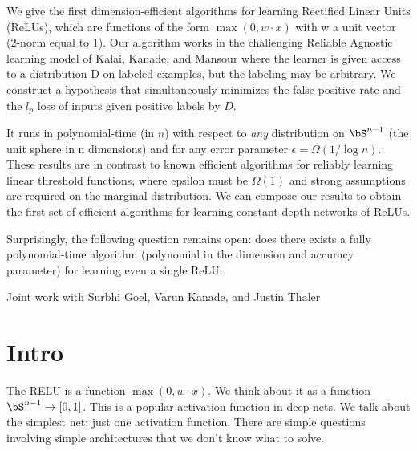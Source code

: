 \def\filepath{C:/Users/oldhe/Dropbox/Math/templates}






\pagestyle{fancy}
\chead{} 
\rhead{} 
\lfoot{} 
\cfoot{\thepage} 
\rfoot{} 
\renewcommand{\headrulewidth}{.3pt} 
\setlength\voffset{0in}
\setlength\textheight{648pt}






We give the first dimension-efficient algorithms for learning
Rectified Linear Units (ReLUs), which are functions of the form $\max(0,
w\cdot x)$ with w a unit vector (2-norm equal to 1). Our algorithm works in
the challenging Reliable Agnostic learning model of Kalai, Kanade, and
Mansour where the learner is given access to a distribution D on
labeled examples, but the labeling may be arbitrary. We construct a
hypothesis that simultaneously minimizes the false-positive rate and
the $l_p$ loss of inputs given positive labels by $D$.

It runs in polynomial-time (in $n$) with respect to {\em any}
distribution on $\bS^{n-1}$ (the unit sphere in n dimensions) and for any
error parameter $\epsilon = \Omega(1/ \log n)$. These results are in
contrast to known efficient algorithms for reliably learning linear
threshold functions, where epsilon must be $\Omega(1)$ and strong
assumptions are required on the marginal distribution. We can compose
our results to obtain the first set of efficient algorithms for
learning constant-depth networks of ReLUs.

Surprisingly, the following question remains open: does there exists a
fully polynomial-time algorithm (polynomial in the dimension and
accuracy parameter) for learning even a single ReLU.

Joint work with Surbhi Goel, Varun Kanade, and Justin Thaler

\section{Intro}

The RELU is a function $\max(0,w\cdot x)$. We think about it as a function $\bS^{n-1}\to [0,1]$. This is a popular activation function in deep nets. We talk about the simplest net: just one activation function. There are simple questions involving simple architectures that we don't know what to solve.

